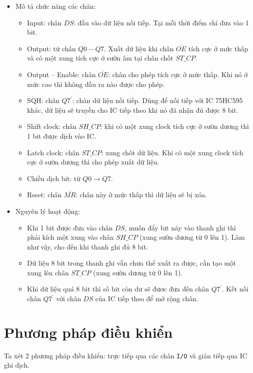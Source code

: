 \begin{itemize}
\item Mô tả chức năng các chân:
\begin{itemize}
\item Input: chân $DS$: đầu vào dữ liệu nối tiếp. Tại mỗi thời điểm chỉ đưa vào 1 bit.
\item Output: từ chân $Q0 - Q7$. Xuất dữ liệu khi chân $\overline{OE}$ tích cực ở mức thấp và có một xung tích cực ở sườn âm tại chân chốt $ST\_CP$.
\item Output -- Enable: chân $\overline{OE}$: chân cho phép tích cực ở mức thấp. Khi nó ở mức cao thì không đầu ra nào được cho phép.
\item SQH: chân $Q7^\prime$: chân dữ liệu nối tiếp. Dùng để nối tiếp với IC 75HC595 khác, dữ liệu sẽ truyền cho IC tiếp theo khi nó đã nhận đủ được 8 bit.
\item Shift clock: chân $SH\_CP$: khi có một xung clock tích cực ở sườn dương thì 1 bit được dịch vào IC.
\item Latch clock: chân $ST\_CP$: xung chốt dữ liệu. Khi có một xung clock tích cực ở sườn dương thì cho phép xuất dữ liệu.
\item Chiều dịch bit: từ $Q0 \rightarrow Q7$.
\item Reset: chân $\overline{MR}$: chân này ở mức thấp thì dữ liệu sẽ bị xóa.
\end{itemize}
\item Nguyên lý hoạt động:
\begin{itemize}
\item Khi 1 bit được đưa vào chân $DS$, muốn đẩy bit này vào thanh ghi thì phải kích một xung vào chân $SH\_CP$ (xung sườn dương từ 0 lên 1). Làm như vậy, cho đến khi thanh ghi đủ 8 bit.
\item Dữ liệu 8 bit trong thanh ghi vẫn chưa thể xuất ra được, cần tạo một xung lên chân $ST\_CP$ (xung sườn dương từ 0 lên 1).
\item Khi dữ liệu quá 8 bit thì số bit còn dư sẽ đươc đưa đến chân $Q7^\prime$. Kết nối chân $Q7^\prime$ với chân $DS$ của IC tiếp theo để mở rộng chân.
\end{itemize}
\end{itemize}
\tocless \section{Phương pháp điều khiển}
Ta xét 2 phương pháp điều khiển: trực tiếp qua các chân \verb|I/O| và gián tiếp qua IC ghi dịch.
